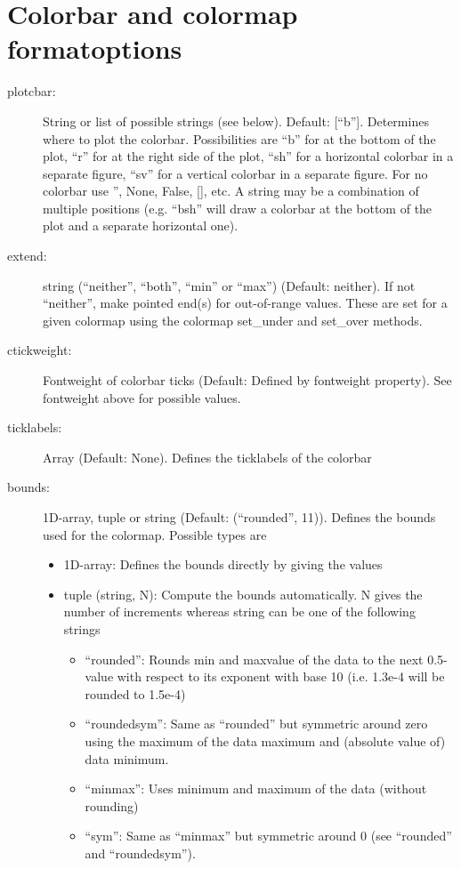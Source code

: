 \section{Colorbar and colormap formatoptions}
\begin{description}
    \item[\gls*{plotcbar}:] \label{item:plotcbar}  String or list of possible strings (see below). Default: [\enquote{b}]. Determines where to plot the colorbar. Possibilities are \enquote{b} for at the bottom of the plot, \enquote{r} for at the right side of the plot, \enquote{sh} for a horizontal colorbar in a separate figure, \enquote{sv} for a vertical colorbar in a separate figure. For no colorbar use '', None, False, [], etc. A string may be a combination of multiple positions (e.g. \enquote{bsh} will draw a colorbar at the bottom of the plot and a separate horizontal one).
    \item[\gls*{extend}:] \label{item:extend}  string (\enquote{neither}, \enquote{both}, \enquote{min} or \enquote{max}) (Default: neither). If not \enquote{neither}, make pointed end(s) for out-of-range values. These are set for a given colormap using the colormap set\_under and set\_over methods.
    \item[\gls*{ctickweight}:] \label{item:ctickweight}  Fontweight of colorbar ticks (Default: Defined by fontweight property). See fontweight above for possible values.
    \item[\gls*{ticklabels}:] \label{item:ticklabels}  Array (Default: None). Defines the ticklabels of the colorbar
    \item[\gls*{bounds}:] \label{item:bounds}  1D-array, tuple or string (Default: (\enquote{rounded}, 11)). Defines the bounds used for the colormap. Possible types are
\begin{itemize}
    \item 1D-array: Defines the bounds directly by giving the values
    \item tuple (string, N): Compute the bounds automatically. N gives the number of increments whereas string can be one of the following strings
\begin{itemize}
        \item \enquote{rounded}: Rounds min and maxvalue of the data to the next 0.5-value with respect to its exponent with base 10 (i.e. 1.3e-4 will be rounded to 1.5e-4)
        \item \enquote{roundedsym}: Same as \enquote{rounded} but symmetric around zero using the maximum of the data maximum and (absolute value of) data minimum.
        \item \enquote{minmax}: Uses minimum and maximum of the data (without rounding)
        \item \enquote{sym}: Same as \enquote{minmax} but symmetric around 0 (see \enquote{rounded} and \enquote{roundedsym}).
\end{itemize}


\end{itemize}
\end{description}
